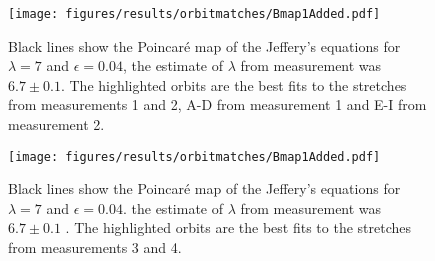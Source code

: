 \begin{figure}[H]
\centering
\texttt{[image: figures/results/orbitmatches/Bmap1Added.pdf]}
\caption{Black lines show the Poincaré map of the Jeffery's equations for $\lambda = 7$ and $\epsilon=0.04$, the estimate of $\lambda$ from measurement was $6.7 \pm 0.1$. The highlighted orbits are the best fits to the stretches from measurements 1 and 2, A-D from measurement 1 and E-I from measurement 2.}
\label{fig:October1Particle4runs2and2Orbits}
\end{figure}


\begin{figure}[H]
\centering
\texttt{[image: figures/results/orbitmatches/Bmap1Added.pdf]}
\caption{Black lines show the Poincaré map of the Jeffery's equations for $\lambda = 7$ and $\epsilon = 0.04$. the estimate of $\lambda$ from measurement was $6.7 \pm 0.1$ . The highlighted orbits are the best fits to the stretches from measurements 3 and 4.}
\label{fig:October1Particle4_runs3and5Orbits}
\end{figure}


